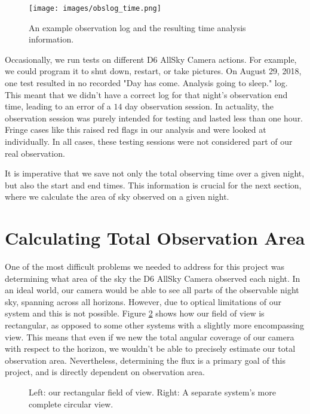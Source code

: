 \begin{figure}[ht!]
  \centering
  \texttt{[image: images/obslog\_time.png]}
  \caption{An example observation log and the resulting time analysis information.}
  \label{obslog_time}
\end{figure}

Occasionally, we run tests on different D6 AllSky Camera actions. 
For example, we could program it to shut down, restart, or take pictures.
On August 29, 2018, one test resulted in no recorded "Day has come.  Analysis going to sleep." log.
This meant that we didn't have a correct log for that night's observation end time, leading to an error of a $14$ day observation session.
In actuality, the observation session was purely intended for testing and lasted less than one hour.  
Fringe cases like this raised red flags in our analysis and were looked at individually.
In all cases, these testing sessions were not considered part of our real observation.


It is imperative that we save not only the total observing time over a given night, but also the start and end times. 
This information is crucial for the next section, where we calculate the area of sky observed on a given night.

\section{Calculating Total Observation Area}

One of the most difficult problems we needed to address for this project was determining what area of the sky the D6 AllSky Camera observed each night.  
In an ideal world, our camera would be able to see all parts of the observable night sky, spanning across all horizons.  
However, due to optical limitations of our system and this is not possible.
Figure \ref{views_sidebyside} shows how our field of view is rectangular, as opposed to some other systems with a slightly more encompassing view.
This means that even if we new the total angular coverage of our camera with respect to the horizon, we wouldn't be able to precisely estimate our total observation area.
Nevertheless, determining the flux is a primary goal of this project, and is directly dependent on observation area. 

\begin{figure}[ht!]
  \caption{Left: our rectangular field of view.  Right:  A separate system's more complete circular view.}
  \label{views_sidebyside}
\end{figure}

